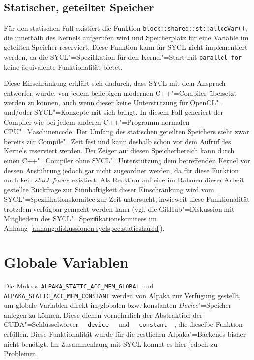 \subsection{Statischer, geteilter Speicher}

Für den statischen Fall existiert die Funktion
\texttt{block::shared::st::allocVar()}, die innerhalb des Kernels aufgerufen
wird und Speicherplatz für eine Variable im geteilten Speicher reserviert. Diese
Funktion kann für SYCL nicht implementiert werden, da die SYCL"=Spezifikation
für den Kernel"=Start mit \texttt{parallel\_for} keine äquivalente
Funktionalität bietet.

Diese Einschränkung erklärt sich dadurch, dass SYCL mit dem Anspruch entworfen
wurde, von jedem beliebigen modernen C++"=Compiler übersetzt werden zu können,
auch wenn dieser keine Unterstützung für OpenCL"= und/oder SYCL"=Konzepte mit
sich bringt. In diesem Fall generiert der Compiler wie bei jedem anderen
C++"=Programm normalen CPU"=Maschinencode. Der Umfang des statischen geteilten
Speichers steht zwar bereits zur Compile"=Zeit fest und kann deshalb schon vor
dem Aufruf des Kernels reserviert werden. Der Zeiger auf diesen Speicherbereich
kann durch einen C++"=Compiler ohne SYCL"=Unterstützung dem betreffenden Kernel
vor dessen Ausführung jedoch gar nicht zugeordnet werden, da für diese Funktion
noch kein \textit{stack frame} existiert. Als Reaktion auf eine im Rahmen dieser
Arbeit gestellte Rückfrage zur Sinnhaftigkeit dieser Einschränkung wird vom
SYCL"=Spezifikationskomitee zur Zeit untersucht, inwieweit diese Funktionalität
trotzdem verfügbar gemacht werden kann (vgl. die GitHub"=Diskussion mit
Mitgliedern des SYCL"=Spezifikationskomitees im
Anhang~\ref{anhang:diskussionen:syclspec:staticshared}).

\section{Globale Variablen}\label{implementierung:globalvar}

Die Makros \texttt{ALPAKA\_STATIC\_ACC\_MEM\_GLOBAL} und
\texttt{ALPAKA\_STATIC\_ACC\_MEM\_CONSTANT} werden von Alpaka zur Verfügung
gestellt, um globale Variablen direkt im globalen bzw. konstanten
\textit{Device}"=Speicher anlegen zu können. Diese dienen vornehmlich der
Abstraktion der CUDA"=Schlüsselwörter \texttt{\_\_device\_\_} und
\texttt{\_\_constant\_\_}, die dieselbe Funktion erfüllen. Diese Funktionalität
wurde für die restlichen Alpaka"=Backends bisher nicht benötigt. Im Zusammenhang
mit SYCL kommt es hier jedoch zu Problemen.

